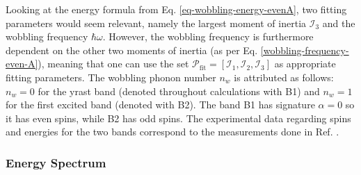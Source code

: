 Looking at the energy formula from Eq. \ref{eq-wobbling-energy-evenA}, two fitting parameters would seem relevant, namely the largest moment of inertia $\mathcal{I}_3$ and the wobbling frequency $\hbar\omega$. However, the wobbling frequency is furthermore dependent on the other two moments of inertia (as per Eq. \ref{wobbling-frequency-even-A}), meaning that one can use the set $\mathcal{P}_\text{fit}=\left[\mathcal{I}_1,\mathcal{I}_2,\mathcal{I}_3\right]$ as appropriate fitting parameters. The wobbling phonon number $n_w$ is attributed as follows: $n_w=0$ for the yrast band (denoted throughout calculations with B1) and $n_w=1$ for the first excited band (denoted with B2). The band B1 has signature $\alpha=0$ so it has even spins, while B2 has odd spins. The experimental data regarding spins and energies for the two bands correspond to the measurements done in Ref. \cite{petrache2019diversity}.

\subsubsection{Energy Spectrum}

